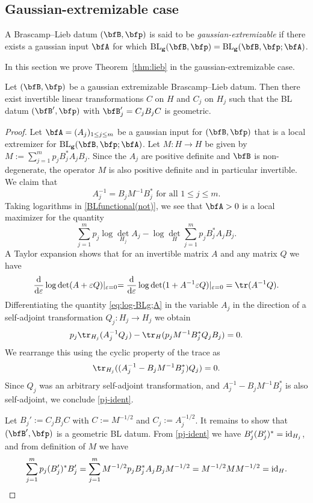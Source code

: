 \subsection{Gaussian-extremizable case}

\begin{definition}
\label{extremizability}
A Brascamp--Lieb datum $(\bfB,\p)$ is said to be \emph{gaussian-extremizable} if there exists a gaussian input $\A$ for which $\BLg(\bfB,\p) = \BLg(\bfB,\p;\A)$.
\end{definition}

In this section we prove Theorem~\ref{thm:lieb} in the gaussian-extremizable case.

\begin{proposition}
\label{normal-form}
Let $(\bfB,\p)$ be a gaussian extremizable Bras\-camp--Lieb datum.
Then there exist invertible linear transformations $C$ on $H$ and $C_{j}$ on $H_{j}$ such that the BL datum $(\bfB',\p)$ with $\bfB_{j}' = C_{j}B_{j}C$ is geometric.
\end{proposition}

\begin{proof}
Let $\A = (A_j)_{1 \leq j \leq m}$ be a gaussian input for $(\bfB,\p)$ that is a local extremizer for $\BLg(\bfB,\p;\A)$.
Let $M: H \to H$ be given by $M := \sum_{j=1}^m p_j B_j^* A_j B_j$.
Since the $A_j$ are positive definite and $\bfB$ is non-degenerate, the operator $M$ is also positive definite and in particular invertible.
We claim that
\begin{equation}\label{pj-ident}
A_j^{-1} = B_j M^{-1} B_j^* \text{ for all } 1 \leq j \leq m.
\end{equation}
Taking logarithms in \eqref{BLfunctional(not)}, we see that $\A > 0$ is a local maximizer for the quantity
\begin{equation}
\label{eq:log-BLg;A}
\sum_{j=1}^m p_j \log \det_{H_j} A_j - \log \det_H \sum_{j=1}^m p_j B_j^* A_j B_j.
\end{equation}
A Taylor expansion shows that for an invertible matrix $A$ and any matrix $Q$ we have
\[
\frac{\dif}{\dif \epsilon} \log \det (A+\epsilon Q) \abs{_{\epsilon=0}
=
\frac{\dif}{\dif \epsilon} \log \det (1+A^{-1}\epsilon Q) }_{\epsilon=0}
=
\tr (A^{-1} Q).
\]
Differentiating the quantity \eqref{eq:log-BLg;A} in the variable $A_{j}$ in the direction of a self-adjoint transformation $Q_{j} : H_j \to H_j$ we obtain
\[
p_j \tr_{H_j}(A_j^{-1} Q_j) - \tr_H( p_j M^{-1} B_j^* Q_j B_j ) = 0.
\]
We rearrange this using the cyclic property of the trace as
\[
\tr_{H_j}( (A_j^{-1} - B_j M^{-1} B_j^*) Q_j ) = 0.
\]
Since $Q_j$ was an arbitrary self-adjoint transformation, and $A_j^{-1} - B_j M^{-1} B_j^*$ is also self-adjoint, we conclude \eqref{pj-ident}.

Let $B_{j}' := C_{j}B_{j}C$ with $C := M^{-1/2}$ and $C_j := A_j^{-1/2}$.
It remains to show that $(\bfB',\p)$ is a geometric BL datum.
From \eqref{pj-ident} we have $B_j' (B_j')^* = \mathrm{id}_{H_j}$, and from definition of $M$ we have
\[
\sum_{j=1}^m p_j (B_j')^* B_j'
=
\sum_{j=1}^m M^{-1/2} p_j B_j^* A_j B_j M^{-1/2}
=
M^{-1/2} M M^{-1/2}
=
\mathrm{id}_H.
\qedhere
\]
\end{proof}

